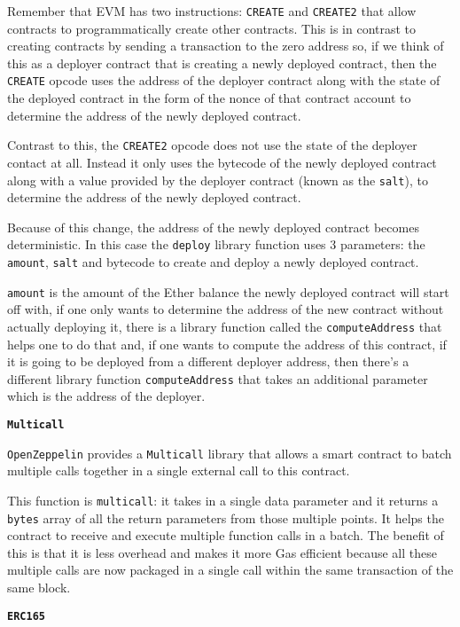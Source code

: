 Remember that EVM has two instructions: \texttt{CREATE} and
\texttt{CREATE2} that allow contracts to programmatically create other
contracts. This is in contrast to creating contracts by sending a
transaction to the zero address so, if we think of this as a deployer
contract that is creating a newly deployed contract, then the
\texttt{CREATE} opcode uses the address of the deployer contract along
with the state of the deployed contract in the form of the nonce of that
contract account to determine the address of the newly deployed
contract.

Contrast to this, the \texttt{CREATE2} opcode does not use the state of
the deployer contact at all. Instead it only uses the bytecode of the
newly deployed contract along with a value provided by the deployer
contract (known as the \texttt{salt}), to determine the address of the
newly deployed contract.

Because of this change, the address of the newly deployed contract
becomes deterministic. In this case the \texttt{deploy} library function
uses 3 parameters: the \texttt{amount}, \texttt{salt} and bytecode to
create and deploy a newly deployed contract.

\texttt{amount} is the amount of the Ether balance the newly deployed
contract will start off with, if one only wants to determine the address
of the new contract without actually deploying it, there is a library
function called the \texttt{computeAddress} that helps one to do that
and, if one wants to compute the address of this contract, if it is
going to be deployed from a different deployer address, then there's a
different library function \texttt{computeAddress} that takes an
additional parameter which is the address of the deployer.

\textbf{\texttt{Multicall}}

\texttt{OpenZeppelin} provides a \texttt{Multicall} library that allows
a smart contract to batch multiple calls together in a single external
call to this contract.

This function is \texttt{multicall}: it takes in a single data parameter
and it returns a \texttt{bytes} array of all the return parameters from
those multiple points. It helps the contract to receive and execute
multiple function calls in a batch. The benefit of this is that it is
less overhead and makes it more Gas efficient because all these multiple
calls are now packaged in a single call within the same transaction of
the same block.

\textbf{\texttt{ERC165}}


